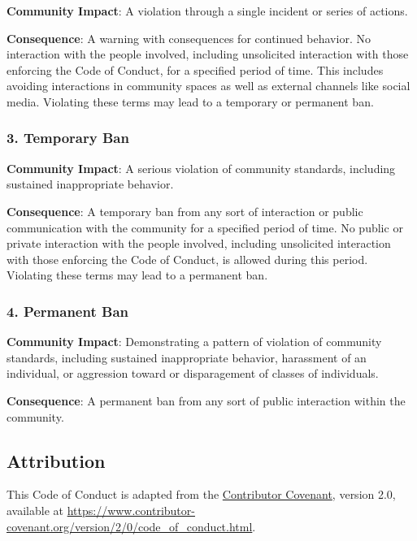 \documentclass[
  fontsize=13pt,
  english,
  a4paper,
  openany, a4paper, oneside]{article}
\begin{document}
\textbf{Community Impact}: A violation through a single incident or series
of actions.

\textbf{Consequence}: A warning with consequences for continued behavior. No
interaction with the people involved, including unsolicited interaction with
those enforcing the Code of Conduct, for a specified period of time. This
includes avoiding interactions in community spaces as well as external channels
like social media. Violating these terms may lead to a temporary or
permanent ban.

\hypertarget{temporary-ban}{%
\subsubsection{3. Temporary Ban}\label{temporary-ban}}

\textbf{Community Impact}: A serious violation of community standards, including
sustained inappropriate behavior.

\textbf{Consequence}: A temporary ban from any sort of interaction or public
communication with the community for a specified period of time. No public or
private interaction with the people involved, including unsolicited interaction
with those enforcing the Code of Conduct, is allowed during this period.
Violating these terms may lead to a permanent ban.

\hypertarget{permanent-ban}{%
\subsubsection{4. Permanent Ban}\label{permanent-ban}}

\textbf{Community Impact}: Demonstrating a pattern of violation of community
standards, including sustained inappropriate behavior, harassment of an
individual, or aggression toward or disparagement of classes of individuals.

\textbf{Consequence}: A permanent ban from any sort of public interaction within
the community.

\hypertarget{attribution}{%
\subsection{Attribution}\label{attribution}}

This Code of Conduct is adapted from the \href{https://www.contributor-covenant.org}{Contributor Covenant},
version 2.0, available at
\url{https://www.contributor-covenant.org/version/2/0/code_of_conduct.html}.
\end{document}
